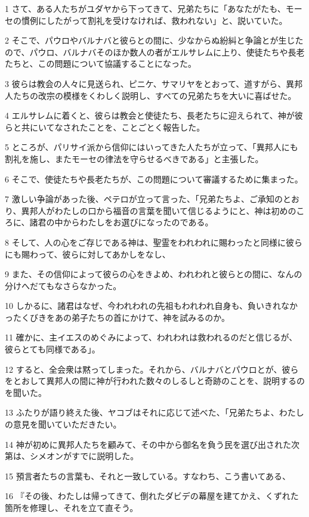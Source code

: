\par 1 さて、ある人たちがユダヤから下ってきて、兄弟たちに「あなたがたも、モーセの慣例にしたがって割礼を受けなければ、救われない」と、説いていた。
\par 2 そこで、パウロやバルナバと彼らとの間に、少なからぬ紛糾と争論とが生じたので、パウロ、バルナバそのほか数人の者がエルサレムに上り、使徒たちや長老たちと、この問題について協議することになった。
\par 3 彼らは教会の人々に見送られ、ピニケ、サマリヤをとおって、道すがら、異邦人たちの改宗の模様をくわしく説明し、すべての兄弟たちを大いに喜ばせた。
\par 4 エルサレムに着くと、彼らは教会と使徒たち、長老たちに迎えられて、神が彼らと共にいてなされたことを、ことごとく報告した。
\par 5 ところが、パリサイ派から信仰にはいってきた人たちが立って、「異邦人にも割礼を施し、またモーセの律法を守らせるべきである」と主張した。
\par 6 そこで、使徒たちや長老たちが、この問題について審議するために集まった。
\par 7 激しい争論があった後、ペテロが立って言った、「兄弟たちよ、ご承知のとおり、異邦人がわたしの口から福音の言葉を聞いて信じるようにと、神は初めのころに、諸君の中からわたしをお選びになったのである。
\par 8 そして、人の心をご存じである神は、聖霊をわれわれに賜わったと同様に彼らにも賜わって、彼らに対してあかしをなし、
\par 9 また、その信仰によって彼らの心をきよめ、われわれと彼らとの間に、なんの分けへだてもなさらなかった。
\par 10 しかるに、諸君はなぜ、今われわれの先祖もわれわれ自身も、負いきれなかったくびきをあの弟子たちの首にかけて、神を試みるのか。
\par 11 確かに、主イエスのめぐみによって、われわれは救われるのだと信じるが、彼らとても同様である」。
\par 12 すると、全会衆は黙ってしまった。それから、バルナバとパウロとが、彼らをとおして異邦人の間に神が行われた数々のしるしと奇跡のことを、説明するのを聞いた。
\par 13 ふたりが語り終えた後、ヤコブはそれに応じて述べた、「兄弟たちよ、わたしの意見を聞いていただきたい。
\par 14 神が初めに異邦人たちを顧みて、その中から御名を負う民を選び出された次第は、シメオンがすでに説明した。
\par 15 預言者たちの言葉も、それと一致している。すなわち、こう書いてある、
\par 16 『その後、わたしは帰ってきて、倒れたダビデの幕屋を建てかえ、くずれた箇所を修理し、それを立て直そう。
